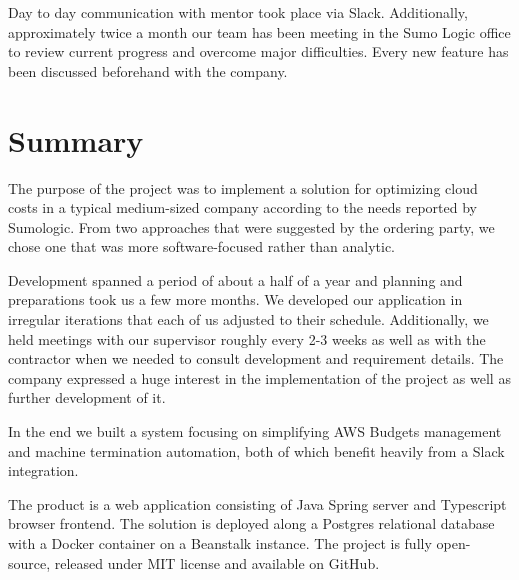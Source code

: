 \documentclass[licencjacka,en]{thesisclass}
\begin{document}
    Day to day communication with mentor took place via Slack.
    Additionally, approximately twice a month our team has been meeting
    in the Sumo Logic office to review current progress and overcome major difficulties.
    Every new feature has been discussed beforehand with the company.

    \chapter{Summary}
    The purpose of the project was to implement a solution for optimizing cloud costs
    in a typical medium-sized company according to the needs reported by Sumologic.
    From two approaches that were suggested by the ordering party,
    we chose one that was more software-focused rather than analytic.

    Development spanned a period of about a half of a year and planning and preparations took us
    a few more months.
    We developed our application in irregular iterations that each of us adjusted
    to their schedule.
    Additionally, we held meetings with our supervisor roughly every 2-3 weeks
    as well as with the contractor when we needed to consult development and requirement details.
    The company expressed a huge interest in the implementation of the project
    as well as further development of it.

    In the end we built a system focusing on simplifying AWS Budgets management
    and machine termination automation,
    both of which benefit heavily from a Slack integration.

    The product is a web application consisting of Java Spring server
    and Typescript browser frontend.
    The solution is deployed along a Postgres relational database with a Docker container
    on a Beanstalk instance.
    The project is fully open-source, released under MIT license
    and available on GitHub.
\end{document}
